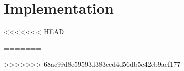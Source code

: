 \chapter{Implementation}
<<<<<<< HEAD


%
%
%


%


=======












>>>>>>> 68ac99d8e59593d383eed4d56db5c42cb9aef177
